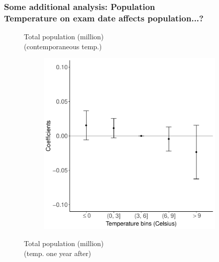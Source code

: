 \documentclass[10pt, pdfmx,hiresbb]{beamer}
\begin{document}
\begin{frame}\frametitle{Some additional analysis: Population \\ Temperature on exam date affects population...?}
  \begin{figure}
    \begin{minipage}{0.44\textwidth}
      \begin{center}
        Total population (million) \\ (contemporaneous temp.)
      \end{center}
      \begin{figure}[h]
        \centering
        \includegraphics[width = \textwidth]{../Output/images/pop_reg_t.pdf}
      \end{figure}
    \end{minipage}
    \begin{minipage}{0.44\textwidth}
      \begin{center}
        Total population (million) \\ (temp. one year after)
      \end{center}
      \begin{figure}[h]

\end{figure}
\end{minipage}
\end{figure}
\end{frame}
\end{document}
